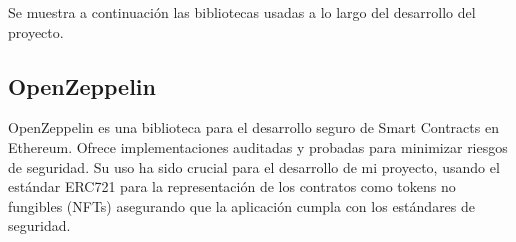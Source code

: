Se muestra a continuación las bibliotecas usadas a lo largo del desarrollo del proyecto.

\subsection{OpenZeppelin}

OpenZeppelin es una biblioteca para el desarrollo seguro de Smart Contracts en Ethereum. Ofrece implementaciones auditadas y probadas para minimizar riesgos de seguridad.
Su uso ha sido crucial para el desarrollo de mi proyecto, usando el estándar ERC721 para la representación de los contratos como tokens no fungibles (NFTs) asegurando que la aplicación cumpla con los estándares de seguridad.

